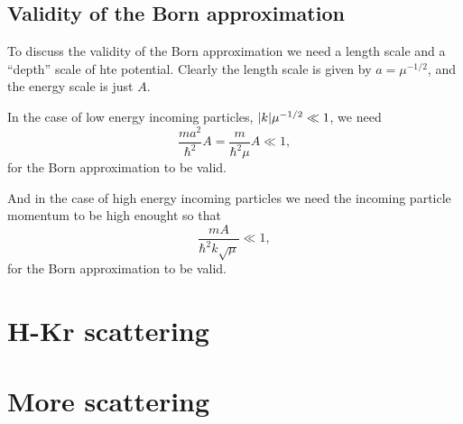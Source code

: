 \documentclass[11pt,letter, swedish, english
]{article}
\begin{document}
\subsection*{Validity of the Born approximation}
To discuss the validity of the Born approximation we need a length
scale and a ``depth'' scale of hte potential. Clearly the length scale
is given by $a=\mu^{-1/2}$, and the energy scale is just $A$.

In the case of low energy incoming particles, $\abs{k}\mu^{-1/2}\ll1$,
we need  
\begin{equation}
\frac{ma^2}{\hbar^2}A=\frac{m}{\hbar^2\mu}A\ll1,
\end{equation}
for the Born approximation to be valid.

And in the case of high energy incoming particles we need the incoming
particle momentum to be high enought so that
\begin{equation}
\frac{mA}{\hbar^2k\sqrt{\mu}}\ll1,
\end{equation}
for the Born approximation to be valid.

\section{H-Kr scattering}


\section{More scattering}
\end{document}
